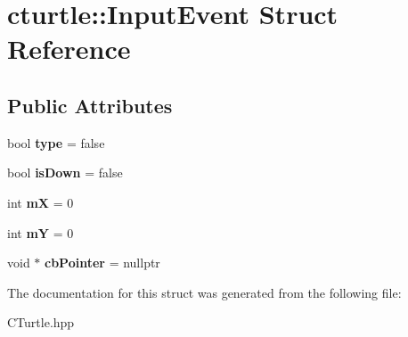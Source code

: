 \hypertarget{structcturtle_1_1InputEvent}{}\section{cturtle\+:\+:Input\+Event Struct Reference}
\label{structcturtle_1_1InputEvent}
\subsection*{Public Attributes}
\begin{DoxyCompactItemize}
\item 
\mbox{\label{structcturtle_1_1InputEvent_a0e599680d6faa3a406bd3322b299c5e5}} 
bool {\bfseries type} = false
\item 
\mbox{\label{structcturtle_1_1InputEvent_a03b38e4d7c525a0202fab84cc128356d}} 
bool {\bfseries is\+Down} = false
\item 
\mbox{\label{structcturtle_1_1InputEvent_ad8ba7f1120fa5337edca37fd96d2d0ab}} 
int {\bfseries mX} = 0
\item 
\mbox{\label{structcturtle_1_1InputEvent_a2862371531d61ed35e86930a46e5df62}} 
int {\bfseries mY} = 0
\item 
\mbox{\label{structcturtle_1_1InputEvent_a3735358812d743ac70943b677a575c2e}} 
void $\ast$ {\bfseries cb\+Pointer} = nullptr
\end{DoxyCompactItemize}


The documentation for this struct was generated from the following file\+:\begin{DoxyCompactItemize}
\item 
C\+Turtle.\+hpp\end{DoxyCompactItemize}
